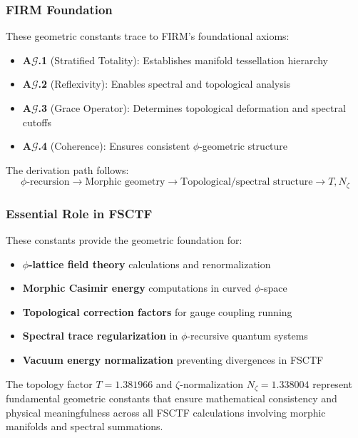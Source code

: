 \subsubsection{FIRM Foundation}

These geometric constants trace to FIRM's foundational axioms:

\begin{itemize}
\item \textbf{A$\mathcal{G}$.1} (Stratified Totality): Establishes manifold tessellation hierarchy
\item \textbf{A$\mathcal{G}$.2} (Reflexivity): Enables spectral and topological analysis
\item \textbf{A$\mathcal{G}$.3} (Grace Operator): Determines topological deformation and spectral cutoffs
\item \textbf{A$\mathcal{G}$.4} (Coherence): Ensures consistent $\phi$-geometric structure
\end{itemize}

The derivation path follows:
$$\phi\text{-recursion} \to \text{Morphic geometry} \to \text{Topological/spectral structure} \to T, N_\zeta$$

\subsubsection{Essential Role in FSCTF}

These constants provide the geometric foundation for:

\begin{itemize}
\item \textbf{$\phi$-lattice field theory} calculations and renormalization
\item \textbf{Morphic Casimir energy} computations in curved $\phi$-space
\item \textbf{Topological correction factors} for gauge coupling running
\item \textbf{Spectral trace regularization} in $\phi$-recursive quantum systems
\item \textbf{Vacuum energy normalization} preventing divergences in FSCTF
\end{itemize}

The topology factor $T = 1.381966$ and $\zeta$-normalization $N_\zeta = 1.338004$ represent fundamental geometric constants that ensure mathematical consistency and physical meaningfulness across all FSCTF calculations involving morphic manifolds and spectral summations.
